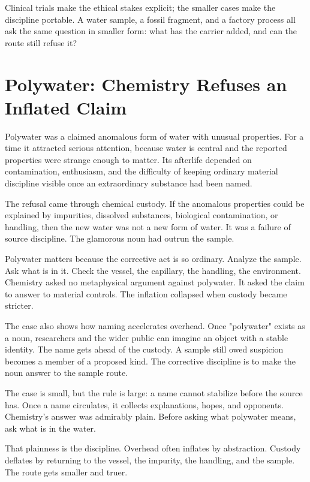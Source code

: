 Clinical trials make the ethical stakes explicit; the smaller cases make
the discipline portable. A water sample, a fossil fragment, and a factory
process all ask the same question in smaller form: what has the carrier
added, and can the route still refuse it?

\section{Polywater: Chemistry Refuses an Inflated Claim}

Polywater was a claimed anomalous form of water with unusual properties. For a
time it attracted serious attention, because water is central and the reported
properties were strange enough to matter. Its afterlife depended on
contamination, enthusiasm, and the difficulty of keeping ordinary material
discipline visible once an extraordinary substance had been named.

The refusal came through chemical custody. If the anomalous properties could
be explained by impurities, dissolved substances, biological contamination, or
handling, then the new water was not a new form of water. It was a failure of
source discipline. The glamorous noun had outrun the sample.

Polywater matters because the corrective act is so ordinary.
Analyze the sample. Ask what is in it. Check the vessel, the capillary, the
handling, the environment. Chemistry asked no metaphysical argument against
polywater. It asked the claim to answer to material controls. The
inflation collapsed when custody became stricter.

The case also shows how naming accelerates overhead. Once "polywater" exists
as a noun, researchers and the wider public can imagine an object with a
stable identity. The name gets ahead of the custody. A sample still owed
suspicion becomes a member of a proposed kind. The corrective discipline
is to make the noun answer to the sample route.

The case is small, but the rule is large: a name cannot stabilize before
the source has. Once a name circulates, it collects
explanations, hopes, and opponents. Chemistry's answer was admirably plain.
Before asking what polywater means, ask what is in the water.

That plainness is the discipline. Overhead often inflates by abstraction. Custody deflates by returning to the vessel, the impurity, the
handling, and the sample. The route gets smaller and truer.

